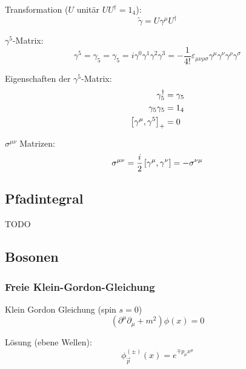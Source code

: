 \documentclass[11pt]{article}
\numberwithin{equation}{section}
\begin{document}
        Transformation ($U$ unitär $U U^\dagger=1_4$):
        \begin{equation}
          \tilde{\gamma} = U \gamma^\mu U^\dagger
        \end{equation}

        $\gamma^5$-Matrix:
        \begin{equation}
          \gamma^5 = \gamma_5 = \gamma_5 = i\gamma^0 \gamma^1 \gamma^2 \gamma^3 = -\frac{1}{4!}\varepsilon_{\mu\nu\rho\sigma} \gamma^\mu \gamma^\nu \gamma^\rho \gamma^\sigma
        \end{equation}

        Eigenschaften der $\gamma^5$-Matrix:
        \begin{equation}
          \begin{aligned}
            \gamma_5^\dagger &= \gamma_5 \\
            \gamma_5 \gamma_5 &= 1_4 \\
            \left[\gamma^\mu,\gamma^5\right]_{+} &= 0 \\
          \end{aligned}
        \end{equation}

        $\sigma^{\mu\nu}$ Matrizen:
        \begin{equation}
          \sigma^{\mu\nu} = \frac{i}{2}\left[\gamma^\mu,\gamma^\nu\right] = -\sigma^{\nu\mu}
        \end{equation}


    \subsection{Pfadintegral}
      TODO

    \subsection{Bosonen}
      \subsubsection{Freie Klein-Gordon-Gleichung}
        Klein Gordon Gleichung (spin $s=0$)
        \begin{equation}
          \left(\partial^\mu\partial_\mu+m^2\right) \phi(x) = 0
        \end{equation}

        Lösung (ebene Wellen):
        \begin{equation}
          {\phi}^{ ( \pm ) }_{\vec{p}} (x) = e^{\mp p_\mu x^\mu}
        \end{equation}
\end{document}
